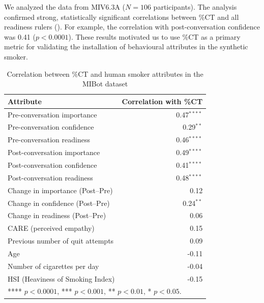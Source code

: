 We analyzed the data from MIV6.3A ($N=106$ participants). The analysis confirmed strong, statistically significant correlations between \%CT and all readiness rulers (). For example, the correlation with post-conversation confidence was 0.41 ($p < 0.0001$). These results motivated us to use \%CT as a primary metric for validating the installation of behavioural attributes in the synthetic smoker.


\begin{table}[!ht]
	\centering
	\begin{tabular}{@{}lr@{}}
		\toprule
		\textbf{Attribute}               & \textbf{Correlation with \%CT} \\
		\midrule
		Pre-conversation importance      & 0.47$^{****}$                  \\
		Pre-conversation confidence      & 0.29$^{**}$                    \\
		Pre-conversation readiness       & 0.46$^{****}$                  \\
		\midrule
		Post-conversation importance     & 0.49$^{****}$                  \\
		Post-conversation confidence     & 0.41$^{****}$                  \\
		Post-conversation readiness      & 0.48$^{****}$                  \\
		\midrule
		Change in importance (Post--Pre) & 0.12                           \\
		Change in confidence (Post--Pre) & 0.24$^{**}$                    \\
		Change in readiness (Post--Pre)  & 0.06                           \\
		\midrule
		CARE (perceived empathy)         & 0.15                           \\
		Previous number of quit attempts & 0.09                           \\
		Age                              & -0.11                          \\
		Number of cigarettes per day     & -0.04                          \\
		HSI (Heaviness of Smoking Index) & -0.15                          \\
		\bottomrule
		\multicolumn{2}{l}{\footnotesize{**** $p < 0.0001$, *** $p < 0.001$, ** $p < 0.01$, * $p < 0.05$}.}
	\end{tabular}
	\caption{Correlation between \%CT and human smoker attributes in the MIBot dataset}
	\label{tab:ct-correlation}
\end{table}



